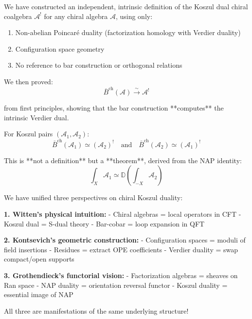 \begin{theorem}\label{thm:main-NAP-resolution}
We have constructed an independent, intrinsic definition of the Koszul dual chiral coalgebra $\mathcal{A}^!$ for any chiral algebra $\mathcal{A}$, using only:
\begin{enumerate}
\item Non-abelian Poincaré duality (factorization homology with Verdier duality)
\item Configuration space geometry
\item No reference to bar construction or orthogonal relations
\end{enumerate}

We then proved:
$$\bar{B}^{\text{ch}}(\mathcal{A}) \xrightarrow{\sim} \mathcal{A}^!$$

from first principles, showing that the bar construction **computes** the intrinsic Verdier dual.

For Koszul pairs $(\mathcal{A}_1, \mathcal{A}_2)$:
$$\bar{B}^{\text{ch}}(\mathcal{A}_1) \simeq (\mathcal{A}_2)^! \quad \text{and} \quad \bar{B}^{\text{ch}}(\mathcal{A}_2) \simeq (\mathcal{A}_1)^!$$

This is **not a definition** but a **theorem**, derived from the NAP identity:
$$\int_X \mathcal{A}_1 \simeq \mathbb{D}\left(\int_{-X} \mathcal{A}_2\right)$$
\end{theorem}

\begin{insight}\label{insight:three-unified}
We have unified three perspectives on chiral Koszul duality:

\textbf{1. Witten's physical intuition:}
- Chiral algebras = local operators in CFT
- Koszul dual = S-dual theory
- Bar-cobar = loop expansion in QFT

\textbf{2. Kontsevich's geometric construction:}
- Configuration spaces = moduli of field insertions
- Residues = extract OPE coefficients
- Verdier duality = swap compact/open supports

\textbf{3. Grothendieck's functorial vision:}
- Factorization algebras = sheaves on Ran space
- NAP duality = orientation reversal functor
- Koszul duality = essential image of NAP

All three are manifestations of the same underlying structure!
\end{insight}

